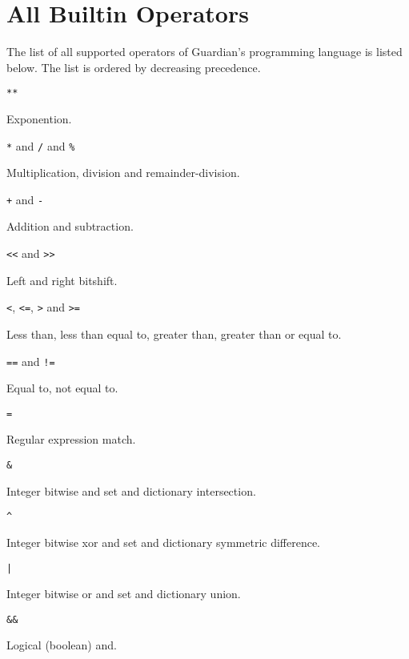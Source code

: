 
\section{All Builtin Operators}
{
	The list of all supported operators of Guardian's programming language
	is listed below. The list is ordered by decreasing precedence.
	
	\begin{itemize}
	{
		\item[] \texttt{**}
		
			Exponention.
		
		\item[] \texttt{*} and \texttt{/} and \texttt{\%}
		
			Multiplication, division and remainder-division.
		
		\item[] \texttt{+} and \texttt{-}
		
			Addition and subtraction.
		
		\item[] \texttt{<<} and \texttt{>>}
		
			Left and right bitshift.
		
		\item[] \texttt{<}, \texttt{<=}, \texttt{>} and \texttt{>=}
		
			Less than, less than equal to, greater than, greater than or equal
			to.
		
		\item[] \texttt{==} and \texttt{!=}
		
			Equal to, not equal to.
		
		\item[] \texttt{=~}
		
			Regular expression match.
		
		\item[] \texttt{\&}
		
			Integer bitwise and set and dictionary intersection.
		
		\item[] \texttt{\^{}}
		
			Integer bitwise xor and set and dictionary symmetric difference.
		
		\item[] \texttt{|}
		
			Integer bitwise or and set and dictionary union.
		
		\item[] \texttt{\&\&}
		
			Logical (boolean) and.
		
}
\end{itemize}}

